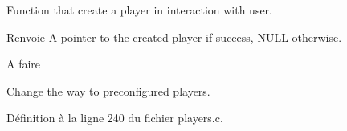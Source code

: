Function that create a player in interaction with user. 

\begin{DoxyReturn}{Renvoie}
A pointer to the created player if success, N\+U\+LL otherwise.
\end{DoxyReturn}
\begin{DoxyRefDesc}{A faire}
\item[\textbf{ A faire}]Change the way to preconfigured players. \end{DoxyRefDesc}


Définition à la ligne 240 du fichier players.\+c.

